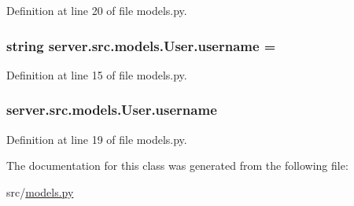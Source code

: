 Definition at line 20 of file models.\+py.

\subsubsection[{\texorpdfstring{username}{username}}]{\setlength{\rightskip}{0pt plus 5cm}string server.\+src.\+models.\+User.\+username = \textquotesingle{}\textquotesingle{}\hspace{0.3cm}{\ttfamily [static]}}\hypertarget{classserver_1_1src_1_1models_1_1_user_acb75051a64b473f00340abd8d8cd379a}{}\label{classserver_1_1src_1_1models_1_1_user_acb75051a64b473f00340abd8d8cd379a}


Definition at line 15 of file models.\+py.

\subsubsection[{\texorpdfstring{username}{username}}]{\setlength{\rightskip}{0pt plus 5cm}server.\+src.\+models.\+User.\+username}\hypertarget{classserver_1_1src_1_1models_1_1_user_a8ff12934f8cd0b6ff62cc6fd926f8e65}{}\label{classserver_1_1src_1_1models_1_1_user_a8ff12934f8cd0b6ff62cc6fd926f8e65}


Definition at line 19 of file models.\+py.



The documentation for this class was generated from the following file\+:\begin{DoxyCompactItemize}
\item 
src/\hyperlink{models_8py}{models.\+py}\end{DoxyCompactItemize}
